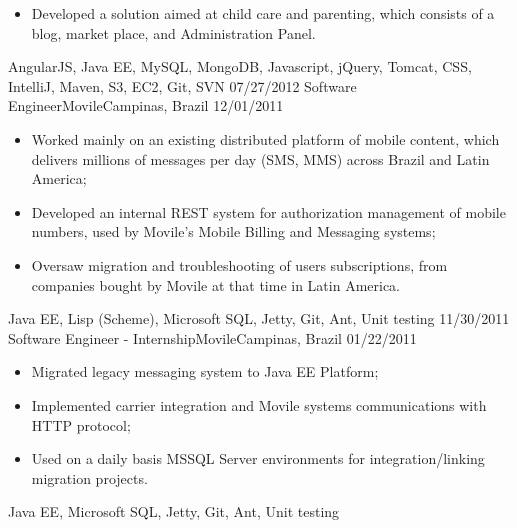 \begin{experiences}
{\begin{itemize}
        \item Developed a solution aimed at child care and parenting, which consists of a blog, market place, and Administration Panel.\\
      \end{itemize}
    }{AngularJS, Java EE, MySQL, MongoDB, Javascript, jQuery, Tomcat, CSS, IntelliJ, Maven, S3, EC2, Git, SVN}
  \emptySeparator
  \experience
    {07/27/2012} {Software Engineer}{Movile}{Campinas, Brazil}
    {12/01/2011}    {
          \begin{itemize}
            \item Worked mainly on an existing distributed platform of mobile content, which delivers millions of
            messages per day (SMS, MMS) across Brazil and Latin America;
            \item Developed an internal REST system for authorization management of mobile numbers,
             used by Movile's Mobile Billing and Messaging systems;
            \item Oversaw migration and troubleshooting of users subscriptions, from companies bought by Movile at that time in Latin America.\\
          \end{itemize}
        }{Java EE, Lisp (Scheme), Microsoft SQL, Jetty, Git, Ant, Unit testing}
  \emptySeparator
  \experience
    {11/30/2011} {Software Engineer - Internship}{Movile}{Campinas, Brazil}
    {01/22/2011}
          {
            \begin{itemize}
              \item Migrated legacy messaging system to Java EE Platform;
              \item Implemented carrier integration and Movile systems communications with HTTP protocol;
              \item Used on a daily basis MSSQL Server environments for integration/linking migration projects.\\
            \end{itemize}
          }{Java EE, Microsoft SQL, Jetty, Git, Ant, Unit testing}
\end{experiences}
